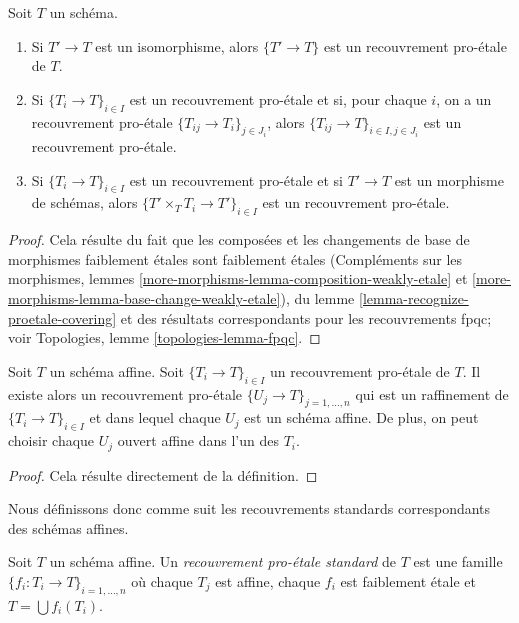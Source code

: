 \begin{lemma}
\label{lemma-proetale}
Soit $T$ un schéma.
\begin{enumerate}
\item Si $T' \to T$ est un isomorphisme, alors $\{T' \to T\}$
est un recouvrement pro-\'etale de $T$.
\item Si $\{T_i \to T\}_{i\in I}$ est un recouvrement pro-\'etale et si, pour chaque
$i$, on a un recouvrement pro-\'etale $\{T_{ij} \to T_i\}_{j\in J_i}$, alors
$\{T_{ij} \to T\}_{i \in I, j\in J_i}$ est un recouvrement pro-\'etale.
\item Si $\{T_i \to T\}_{i\in I}$ est un recouvrement pro-\'etale
et si $T' \to T$ est un morphisme de schémas, alors
$\{T' \times_T T_i \to T'\}_{i\in I}$ est un recouvrement pro-\'etale.
\end{enumerate}
\end{lemma}

\begin{proof}
Cela résulte du fait que les composées et les changements de base
de morphismes faiblement \'etales sont faiblement \'etales
(Compléments sur les morphismes, lemmes
\ref{more-morphisms-lemma-composition-weakly-etale} et
\ref{more-morphisms-lemma-base-change-weakly-etale}),
du lemme \ref{lemma-recognize-proetale-covering} et
des résultats correspondants pour les recouvrements fpqc; voir
Topologies, lemme \ref{topologies-lemma-fpqc}.
\end{proof}

\begin{lemma}
\label{lemma-proetale-affine}
Soit $T$ un schéma affine. Soit $\{T_i \to T\}_{i \in I}$ un recouvrement pro-\'etale
de $T$. Il existe alors un recouvrement pro-\'etale
$\{U_j \to T\}_{j = 1, \ldots, n}$ qui est un raffinement
de $\{T_i \to T\}_{i \in I}$ et dans lequel chaque $U_j$ est un schéma
affine. De plus, on peut choisir chaque $U_j$ ouvert affine
dans l'un des $T_i$.
\end{lemma}

\begin{proof}
Cela résulte directement de la définition.
\end{proof}

\noindent
Nous définissons donc comme suit les recouvrements standards correspondants des schémas affines.

\begin{definition}
\label{definition-standard-proetale}
Soit $T$ un schéma affine. Un {\it recouvrement pro-\'etale standard}
de $T$ est une famille $\{f_i : T_i \to T\}_{i = 1, \ldots, n}$
où chaque $T_j$ est affine, chaque $f_i$ est faiblement \'etale et
$T = \bigcup f_i(T_i)$.
\end{definition}

